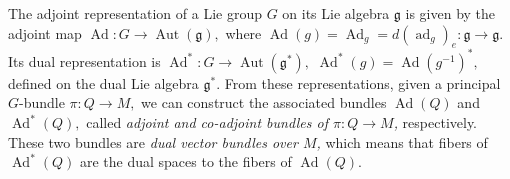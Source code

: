 \documentclass[12pt, letterpaper, reqno]{amsart}
\theoremstyle{definition}
\theoremstyle{plain}
\theoremstyle{remark}
\begin{document}
The adjoint representation of a Lie group $ G $ on its Lie algebra $ \mathfrak{g} $ is given by the adjoint map $ \operatorname{Ad} : G \rightarrow \operatorname{Aut}( \mathfrak{g}),  $ where $ \operatorname{Ad} (g)= \operatorname{Ad}_g= d( \operatorname{ad}_g )_e : \mathfrak{g}\rightarrow \mathfrak{g}. $ Its dual representation is $ \operatorname{Ad}^*: G \rightarrow \operatorname{Aut} ( \mathfrak{g}^* ), $ $ \operatorname{Ad}^*(g)= \operatorname{Ad} (g^{-1})^*, $ defined on the dual Lie algebra $ \mathfrak{g}^*. $ From these representations, given a principal $ G $-bundle $ \pi: Q \rightarrow M, $ we can construct the associated bundles $ \operatorname{Ad}(Q) $ and $ \operatorname{Ad}^*(Q), $ called \textit{adjoint and co-adjoint bundles of $ \pi:Q \rightarrow M $, } respectively. These two bundles are \textit{dual vector bundles over $ M $,} which means that fibers of $  \operatorname{Ad}^*(Q)$ are the dual spaces to the fibers of $ \operatorname{Ad} (Q). $ 
\end{document}
